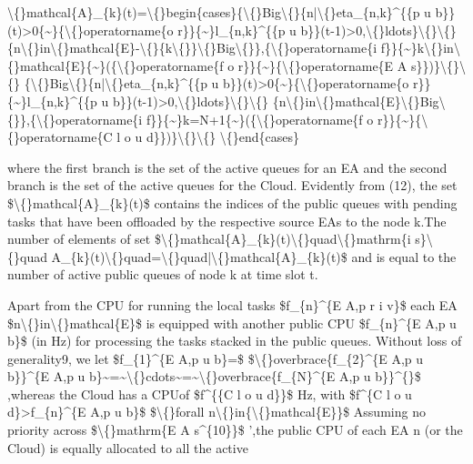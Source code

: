 \documentclass{article}
\begin{document}
\textbackslash\{\}mathcal\{A\}\_\{k\}(t)=\textbackslash\{\}begin\{cases\}\{\textbackslash\{\}Big\textbackslash\{\}\{n|\textbackslash\{\}eta\_\{n,k\}\textasciicircum{}\{\{p u b\}\}(t)>0\{\textasciitilde{}\}\{\textbackslash\{\}operatorname\{o r\}\}\{\textasciitilde{}\}l\_\{n,k\}\textasciicircum{}\{\{p u b\}\}(t-1)>0,\textbackslash\{\}ldots\}\textbackslash\{\}\textbackslash\{\} \{n\textbackslash\{\}in\textbackslash\{\}mathcal\{E\}-\textbackslash\{\}\{k\textbackslash\{\}\}\textbackslash\{\}Big\textbackslash\{\}\},\{\textbackslash\{\}operatorname\{i f\}\}\{\textasciitilde{}\}k\textbackslash\{\}in\textbackslash\{\}mathcal\{E\}\{\textasciitilde{}\}(\{\textbackslash\{\}operatorname\{f o r\}\}\{\textasciitilde{}\}\{\textbackslash\{\}operatorname\{E A s\}\})\}\textbackslash\{\}\textbackslash\{\} \{\textbackslash\{\}Big\textbackslash\{\}\{n|\textbackslash\{\}eta\_\{n,k\}\textasciicircum{}\{\{p u b\}\}(t)>0\{\textasciitilde{}\}\{\textbackslash\{\}operatorname\{o r\}\}\{\textasciitilde{}\}l\_\{n,k\}\textasciicircum{}\{\{p u b\}\}(t-1)>0,\textbackslash\{\}ldots\}\textbackslash\{\}\textbackslash\{\} \{n\textbackslash\{\}in\textbackslash\{\}mathcal\{E\}\textbackslash\{\}Big\textbackslash\{\}\},\{\textbackslash\{\}operatorname\{i f\}\}\{\textasciitilde{}\}k=N+1\{\textasciitilde{}\}(\{\textbackslash\{\}operatorname\{f o r\}\}\{\textasciitilde{}\}\{\textbackslash\{\}operatorname\{C l o u d\}\})\}\textbackslash\{\}\textbackslash\{\} \textbackslash\{\}end\{cases\}

where the first branch is the set of the active queues for an EA and the second branch is the set of the active queues for the Cloud. Evidently from (12), the set \$\textbackslash\{\}mathcal\{A\}\_\{k\}(t)\$ contains the indices of the public queues with pending tasks that have been offloaded by the respective source EAs to the node k.The number of elements of set \$\textbackslash\{\}mathcal\{A\}\_\{k\}(t)\textbackslash\{\}quad\textbackslash\{\}mathrm\{i s\}\textbackslash\{\}quad A\_\{k\}(t)\textbackslash\{\}quad=\textbackslash\{\}quad|\textbackslash\{\}mathcal\{A\}\_\{k\}(t)\$ and is equal to the number of active public queues of node k at time slot t.

Apart from the CPU for running the local tasks \$f\_\{n\}\textasciicircum{}\{E A,p r i v\}\$ each EA \$n\textbackslash\{\}in\textbackslash\{\}mathcal\{E\}\$ is equipped with another public CPU \$f\_\{n\}\textasciicircum{}\{E A,p u b\}\$ (in Hz) for processing the tasks stacked in the public queues. Without loss of generality9, we let \$f\_\{1\}\textasciicircum{}\{E A,p u b\}=\$ \$\textbackslash\{\}overbrace\{f\_\{2\}\textasciicircum{}\{E A,p u b\}\}\textasciicircum{}\{E A,p u b\}\textasciitilde{}=\textasciitilde{}\textbackslash\{\}cdots\textasciitilde{}=\textasciitilde{}\textbackslash\{\}overbrace\{f\_\{N\}\textasciicircum{}\{E A,p u b\}\}\textasciicircum{}\{\}\$ ,whereas the Cloud has a CPUof \$f\textasciicircum{}\{\{C l o u d\}\}\$ Hz, with \$f\textasciicircum{}\{C l o u d\}>f\_\{n\}\textasciicircum{}\{E A,p u b\}\$ \$\textbackslash\{\}forall n\textbackslash\{\}in\{\textbackslash\{\}mathcal\{E\}\}\$ Assuming no priority across \$\textbackslash\{\}mathrm\{E A s\textasciicircum{}\{10\}\}\$ ',the public CPU of each EA n (or the Cloud) is equally allocated to all the active
\end{document}
